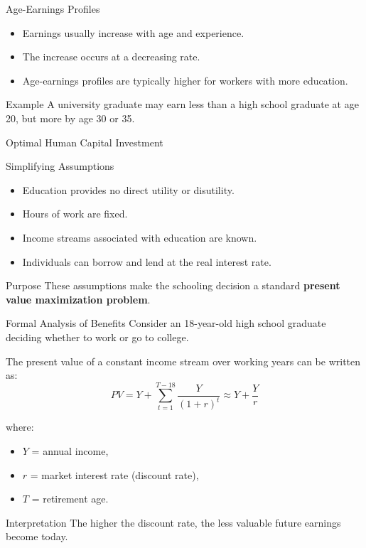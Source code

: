 \documentclass[aspectratio=169]{beamer}
\begin{document}
\begin{frame}{Age-Earnings Profiles}
\transfade
\begin{itemize}
  \item Earnings usually increase with age and experience.
  \item The increase occurs at a decreasing rate.
  \item Age-earnings profiles are typically higher for workers with more education.
\end{itemize}

\begin{exampleblock}{Example}
A university graduate may earn less than a high school graduate at age 20, but more by age 30 or 35.
\end{exampleblock}
\end{frame}

\begin{frame}{Optimal Human Capital Investment}
\transfade
\begin{block}{Simplifying Assumptions}
\begin{itemize}
  \item Education provides no direct utility or disutility.
  \item Hours of work are fixed.
  \item Income streams associated with education are known.
  \item Individuals can borrow and lend at the real interest rate.
\end{itemize}
\end{block}

\begin{block}{Purpose}
These assumptions make the schooling decision a standard \textbf{present value maximization problem}.
\end{block}
\end{frame}

\begin{frame}{Formal Analysis of Benefits}
\transfade
Consider an 18-year-old high school graduate deciding whether to work or go to college.

The present value of a constant income stream over working years can be written as:
\[
PV = Y+ \sum_{t=1}^{T-18} \frac{Y}{(1+r)^t}
\approx Y+\frac{Y}{r}\]

where:
\begin{itemize}
  \item \(Y\) = annual income,
  \item \(r\) = market interest rate (discount rate),
  \item \(T\) = retirement age.
\end{itemize}

\begin{block}{Interpretation}
The higher the discount rate, the less valuable future earnings become today.
\end{block}
\end{frame}
\end{document}
